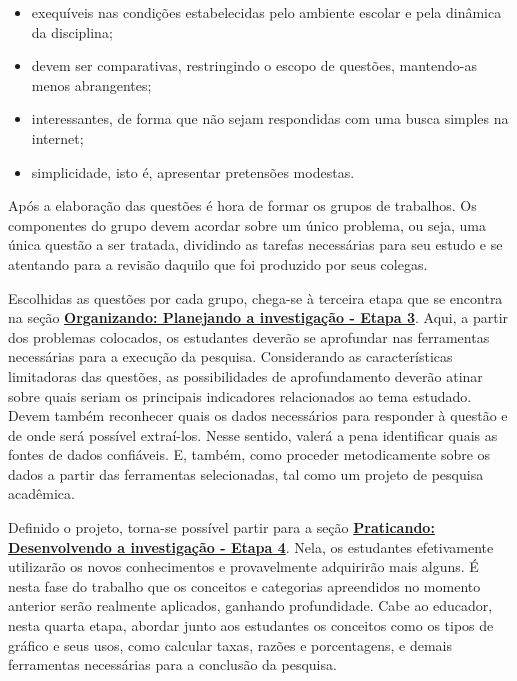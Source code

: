 \begin{apresentacao}
\begin{itemize}
\item exequíveis nas condições estabelecidas pelo ambiente escolar e pela dinâmica da disciplina;

\item devem ser comparativas, restringindo o escopo de questões, mantendo-as menos abrangentes;

\item interessantes, de forma que não sejam respondidas com uma busca simples na internet;

\item simplicidade, isto é, apresentar pretensões modestas.
\end{itemize}

Após a elaboração das questões é hora de formar os grupos de trabalhos. Os componentes do grupo devem acordar sobre um único problema, ou seja, uma única questão a ser tratada, dividindo as tarefas necessárias para seu estudo e se atentando para a revisão daquilo que foi produzido por seus colegas.

Escolhidas as questões por cada grupo, chega-se à terceira etapa que se encontra na seção \hyperref[etapa3]{\textcolor{session4}{\textbf{Organizando: Planejando a investigação - Etapa 3}}}. Aqui, a partir dos problemas colocados, os estudantes deverão se aprofundar nas ferramentas necessárias para a execução da pesquisa. Considerando as características limitadoras das questões, as possibilidades de aprofundamento deverão atinar sobre quais seriam os principais indicadores relacionados ao tema estudado. Devem também reconhecer quais os dados necessários para responder à questão e de onde será possível extraí-los. Nesse sentido, valerá a pena identificar quais as fontes de dados confiáveis. E, também, como proceder metodicamente sobre os dados a partir das ferramentas selecionadas, tal como um projeto de pesquisa acadêmica.

Definido o projeto, torna-se possível partir para a seção \hyperref[etapa4]{\textcolor{session2}{\textbf{Praticando: Desenvolvendo a investigação - Etapa 4}}}. Nela, os estudantes efetivamente utilizarão os novos conhecimentos e provavelmente adquirirão mais alguns. É nesta fase do trabalho que os conceitos e categorias apreendidos no momento anterior serão realmente aplicados, ganhando profundidade. Cabe ao educador, nesta quarta etapa, abordar junto aos estudantes os conceitos como os tipos de gráfico e seus usos, como calcular taxas, razões e porcentagens, e demais ferramentas necessárias para a conclusão da pesquisa.


\end{apresentacao}
